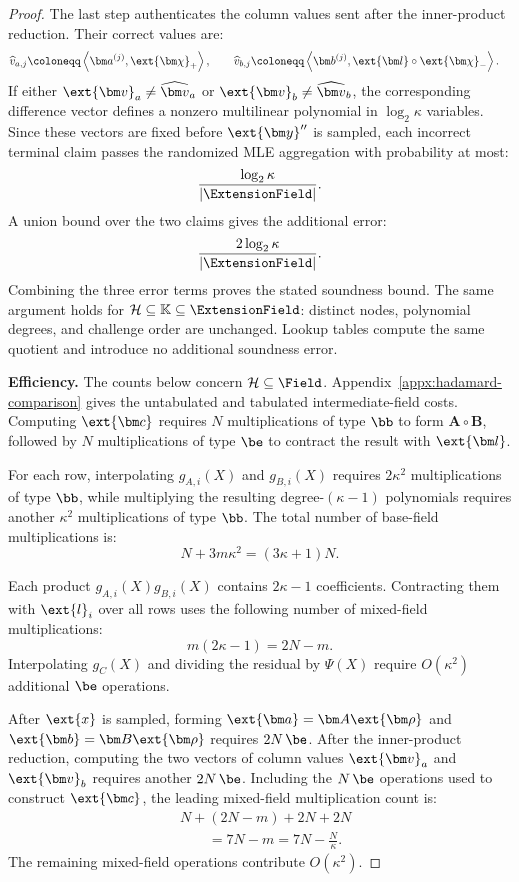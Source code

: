 \begin{proof}
The last step authenticates the column values sent after the
inner-product reduction. Their correct values are:
\[
\begin{aligned}
    \widehat v_{a,j}
    &\coloneqq
    \left\langle
        \bm a^{(j)},\ext{\bm\chi}_+
    \right\rangle,
    \qquad
    \widehat v_{b,j}
    \coloneqq
    \left\langle
        \bm b^{(j)},
        \ext{\bm l}\circ\ext{\bm\chi}_-
    \right\rangle.
\end{aligned}
\]
If either
\(\ext{\bm v}_a\neq\widehat{\bm v}_a\) or
\(\ext{\bm v}_b\neq\widehat{\bm v}_b\), the corresponding
difference vector defines a nonzero multilinear polynomial in
\(\log_2\kappa\) variables. Since these vectors are fixed before
\(\ext{\bm y}''\) is sampled, each incorrect terminal claim
passes the randomized MLE aggregation with probability at most:
\[
    \frac{\log_2\kappa}{|\ExtensionField|}.
\]
A union bound over the two claims gives the additional error:
\[
    \frac{2\log_2\kappa}{|\ExtensionField|}.
\]
Combining the three error terms proves the stated soundness bound.
The same argument holds for \(\mathcal H\subseteq\mathbb K
\subseteq\ExtensionField\): distinct nodes, polynomial degrees,
and challenge order are unchanged. Lookup tables compute the
same quotient and introduce no additional soundness error.

\smallskip\noindent\textbf{Efficiency.}
The counts below concern \(\mathcal H\subseteq\Field\).
Appendix~\ref{appx:hadamard-comparison} gives the untabulated
and tabulated intermediate-field costs.
Computing
\(\ext{\bm c}\) requires \(N\) multiplications of type \(\bb\)
to form \(\bm A\circ\bm B\), followed by \(N\) multiplications
of type \(\be\) to contract the result with
\(\ext{\bm l}\).

For each row, interpolating
\(g_{A,i}(X)\) and \(g_{B,i}(X)\) requires
\(2\kappa^2\) multiplications of type \(\bb\), while multiplying
the resulting degree-\((\kappa-1)\) polynomials requires another
\(\kappa^2\) multiplications of type \(\bb\). The total number
of base-field multiplications is:
\[
    N+3m\kappa^2
    =
    (3\kappa+1)N.
\]

Each product
\(g_{A,i}(X)g_{B,i}(X)\) contains \(2\kappa-1\)
coefficients. Contracting them with \(\ext{l}_i\) over all rows
uses the following number of mixed-field multiplications:
\[
    m(2\kappa-1)
    =
    2N-m.
\]
Interpolating \(g_C(X)\) and dividing the residual by \(\Psi(X)\)
require
\(O(\kappa^2)\) additional \(\be\) operations.

After \(\ext{x}\) is sampled, forming
\(\ext{\bm a}=\bm A\ext{\bm\rho}\) and
\(\ext{\bm b}=\bm B\ext{\bm\rho}\) requires \(2N\,\be\).
After the inner-product reduction, computing the two vectors of
column values \(\ext{\bm v}_a\) and \(\ext{\bm v}_b\) requires
another \(2N\,\be\). Including the \(N\,\be\) operations used to
construct \(\ext{\bm c}\), the leading mixed-field multiplication
count is:
\[
\begin{aligned}
    &N+(2N-m)+2N+2N\\
    &\qquad=
    7N-m
    =
    7N-\frac{N}{\kappa}.
\end{aligned}
\]
The remaining mixed-field operations contribute \(O(\kappa^2)\).


\end{proof}
